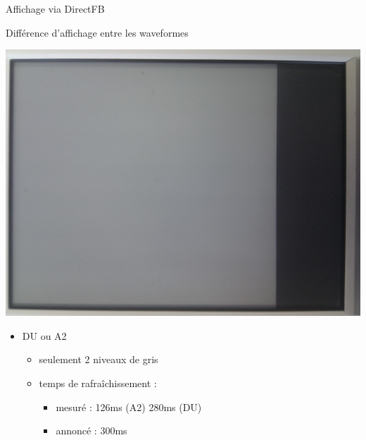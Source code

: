 \begin{frame}{ Affichage via DirectFB }
	\begin{block} { Différence d'affichage entre les waveformes }
		\parbox{0.3\linewidth}{
			\includegraphics[angle=-90,origin=c,scale=0.04]{du_a2.jpg}
		}
		\parbox{0.6\linewidth}{
			\begin{itemize}
				\item DU ou A2
				\begin{itemize}
					\item seulement 2 niveaux de gris
					\item temps de rafraîchissement : 
					\begin{itemize}
						\item mesuré  : 126ms (A2) 280ms (DU)
						\item annoncé  : 300ms
					\end{itemize}		
				\end{itemize}
			\end{itemize}
		}
	\end{block}
\end{frame}